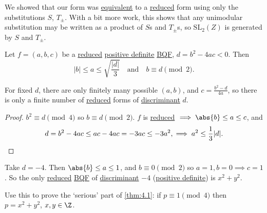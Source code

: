 \documentclass{article}
\newcommand{\legendre}[2]{\genfrac{(}{)}{}{}{#1}{#2}}
\newcommand{\SL}{\mathrm{SL}}
\DeclareMathOperator{\disc}{disc}
\begin{document}
\begin{remark}
    We showed that our form was \hyperlink{def:uniSub}{equivalent} to a \hyperlink{def:reduced}{reduced} form using only the substitutions $S$, $T_\pm$.
    With a bit more work, this shows that any unimodular substitution may be written as a product of $S$s and $T_\pm$s, so $\SL _2(Z)$ is generated by $S$ and $T_\pm$.
\end{remark}


\begin{nlemma}\label{lem:4.6}
    Let $f = (a,b,c)$ be a \hyperlink{def:reduced}{reduced} \hyperlink{def:definite}{positive definite} \hyperlink{def:bqf}{BQF}, $d = b^2 - 4ac < 0$.
    Then
    \begin{equation*}|b| \leq a \leq \sqrt{\frac{|d|}{3}}\quad \text{and} \quad b \equiv d \pmod{2}.\end{equation*}
\end{nlemma}

\begin{remark}
    For fixed $d$, there are only finitely many possible $(a, b)$, and $c = \frac{b^2 - d}{4a}$, so there is only a finite number of \hyperlink{def:reduced}{reduced} forms of \hyperlink{def:disc}{discriminant} $d$.
\end{remark}

\begin{proof}
    $b^2 \equiv d \pmod{4}$ so $b \equiv d \pmod{2}$.
    $f$ is \hyperlink{def:reduced}{reduced} $\implies \abs{b} \leq a \leq c$, and
    \begin{equation*}d = b^2 - 4ac \leq ac - 4ac = -3ac \leq -3a^2, \implies a^2 \leq \frac{1}{3} |d|.\qedhere\end{equation*}
\end{proof}

\begin{eg}
    Take $d = -4$.
    Then $\abs{b} \leq a \leq 1$, and $b \equiv 0 \pmod{2}$ so $a = 1, b=0 \implies c=1$.
    So the only \hyperlink{def:reduced}{reduced} \hyperlink{def:bqf}{BQF} of \hyperlink{def:disc}{discriminant} $-4$ (\hyperlink{def:definite}{positive definite}) is $x^2 + y^2$.

    Use this to prove the `serious' part of \cref{thm:4.1}: if $p \equiv 1 \pmod{4}$ then $p = x^2 + y^2$, $x, y \in \Z$.

\end{eg}
\end{document}
